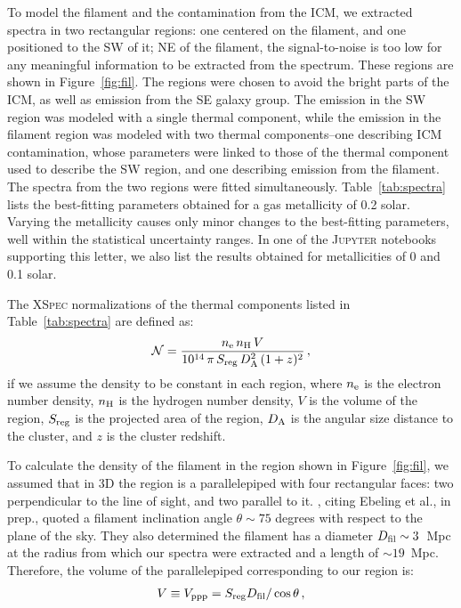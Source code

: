 To model the filament and the contamination from the ICM, we extracted spectra in two rectangular regions: one centered on the filament, and one positioned to the SW of it; NE of the filament, the signal-to-noise is too low for any meaningful information to be extracted from the spectrum. These regions are shown in Figure~\ref{fig:fil}. The regions were chosen to avoid the bright parts of the ICM, as well as emission from the SE galaxy group. The emission in the SW region was modeled with a single thermal component, while the emission in the filament region was modeled with two thermal components--one describing ICM contamination, whose parameters were linked to those of the thermal component used to describe the SW region, and one describing emission from the filament. The spectra from the two regions were fitted simultaneously. Table~\ref{tab:spectra} lists the best-fitting parameters obtained for a gas metallicity of 0.2 solar. Varying the metallicity causes only minor changes to the best-fitting parameters, well within the statistical uncertainty ranges. In one of the \textsc{Jupyter} notebooks supporting this letter, we also list the results obtained for metallicities of 0 and 0.1 solar.

The \textsc{XSpec} normalizations of the thermal components listed in Table~\ref{tab:spectra} are defined as:
\begin{equation}
	\mathcal{N} = \frac{n_{\rm e} \, n_{\rm H} \, V}{10^{14} \, \pi \, S_{\rm reg} \, D_{\rm A}^2 \, (1+z)^2} \, , 
\label{eq:norm}
\end{equation}
if we assume the density to be constant in each region, where $n_{\rm e}$ is the electron number density, $n_{\rm H}$ is the hydrogen number density, $V$ is the volume of the region, $S_{\rm reg}$ is the projected area of the region, $D_{\rm A}$ is the angular size distance to the cluster, and $z$ is the cluster redshift.

To calculate the density of the filament in the region shown in Figure~\ref{fig:fil}, we assumed that in 3D the region is a parallelepiped with four rectangular faces: two perpendicular to the line of sight, and two parallel to it. \citet{Jauzac2012}, citing Ebeling et al., in prep., quoted a filament inclination angle $\theta \sim 75$ degrees with respect to the plane of the sky. They also determined the filament has a diameter $D_{\rm fil} \sim 3$~Mpc at the radius from which our spectra were extracted and a length of $\sim 19$~Mpc. Therefore, the volume of the parallelepiped corresponding to our region is:
\begin{eqnarray}
    V \equiv V_{\rm ppp} = S_{\rm reg} D_{\rm fil} / \cos\theta\, , 
\label{eq:v_ppp}
\end{eqnarray}

